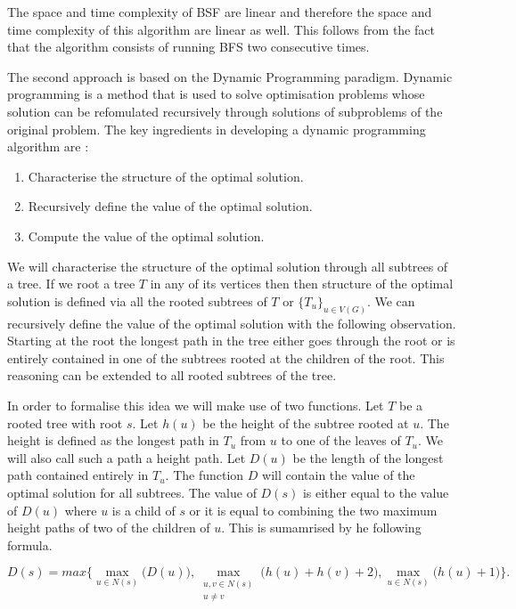The space and time complexity of BSF are linear \cite{intro-to-algo} and therefore the space and time complexity of this algorithm are linear as well. This follows from the fact that the algorithm consists of running BFS two consecutive times.

The second approach is based on the Dynamic Programming paradigm. Dynamic programming is a method that is used to solve optimisation problems whose solution can be refomulated recursively through solutions of subproblems of the original problem. The key ingredients in developing a dynamic programming algorithm are \cite{intro-to-algo}:

\begin{enumerate}
    \item Characterise the structure of the optimal solution.
    \item Recursively define the value of the optimal solution.
    \item Compute the value of the optimal solution.
\end{enumerate}

We will characterise the structure of the optimal solution through all subtrees of a tree. If we root a tree $T$ in any of its vertices then then structure of the optimal solution is defined via all the rooted subtrees of $T$ or $\{T_u\}_{u \in V(G)}$. We can recursively define the value of the optimal solution with the following observation. Starting at the root the longest path in the tree either goes through the root or is entirely contained in one of the subtrees rooted at the children of the root. This reasoning can be extended to all rooted subtrees of the tree.

In order to formalise this idea we will make use of two functions. Let $T$ be a rooted tree with root $s$. Let $h(u)$ be the height of the subtree rooted at $u$. The height is defined as the longest path in $T_u$ from $u$ to one of the leaves of $T_u$. We will also call such a path a height path. Let $D(u)$ be the length of the longest path contained entirely in $T_u$. The function $D$ will contain the value of the optimal solution for all subtrees. The value of $D(s)$ is either equal to the value of $D(u)$ where $u$ is a child of $s$ or it is equal to combining the two maximum height paths of two of the children of $u$. This is sumamrised by he following formula.

$$ D(s) = max\bigg\{ \max\limits_{u \in N(s)}\bigg(D(u)\bigg), \max\limits_{\substack{u, v \in N(s) \\ u \ne v}} \bigg(h(u) + h(v) + 2\bigg) , \max\limits_{u \in N(s)}\bigg(h(u) + 1 \bigg)   \bigg\}. $$

